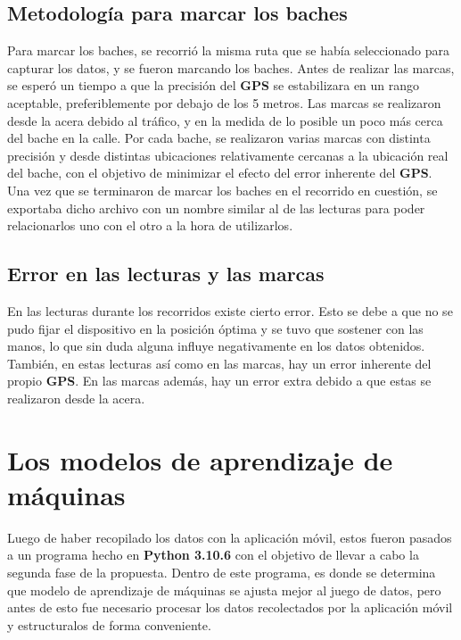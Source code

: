 	\subsection{Metodología para marcar los baches}
		Para marcar los baches, se recorrió la misma ruta que se había seleccionado para capturar los datos, y se fueron marcando los baches. Antes 
		de realizar las marcas, se esperó un tiempo a que la precisión del \textbf{GPS} se estabilizara en un rango aceptable, preferiblemente por debajo 
		de los 5 metros. Las marcas se realizaron desde la acera debido al tráfico, y en la medida de lo posible un poco más cerca del bache en la calle.
		Por cada bache, se realizaron varias marcas con distinta precisión y desde distintas ubicaciones relativamente cercanas a la ubicación real del
		bache, con el objetivo de minimizar el efecto del error inherente del \textbf{GPS}. Una vez que se terminaron de marcar los baches en el recorrido
		en cuestión, se exportaba dicho archivo con un nombre similar al de las lecturas para poder relacionarlos uno con el otro a la hora de utilizarlos.

	\subsection{Error en las lecturas y las marcas}
		En las lecturas durante los recorridos existe cierto error. Esto se debe a que no se pudo fijar el dispositivo en la posición óptima y se tuvo que
		sostener con las manos, lo que sin duda alguna influye negativamente en los datos obtenidos. También, en estas lecturas así como en las marcas, hay un
		error inherente del propio \textbf{GPS}. En las marcas además, hay un error extra debido a que estas se realizaron desde la acera.

\section{Los modelos de aprendizaje de máquinas}
	Luego de haber recopilado los datos con la aplicación móvil, estos fueron pasados a un programa hecho en \textbf{Python 3.10.6}  con el objetivo de llevar a cabo 
	la segunda fase de la propuesta. Dentro de este programa, es donde se determina que modelo de aprendizaje de máquinas se ajusta mejor al juego de datos,
	pero antes de esto fue necesario procesar los datos recolectados por la aplicación móvil y estructuralos de forma conveniente. 

